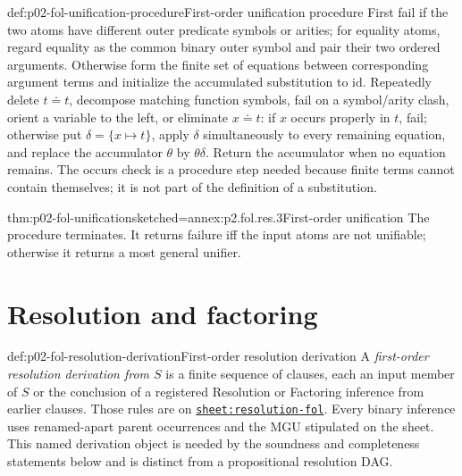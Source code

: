 \begin{hbmethod}{def:p02-fol-unification-procedure}{First-order unification procedure}
First fail if the two atoms have different outer predicate symbols or arities;
for equality atoms, regard equality as the common binary outer symbol and pair
their two ordered arguments.  Otherwise form the finite set of equations
between corresponding argument terms and initialize the accumulated
substitution to \(\mathrm{id}\).  Repeatedly delete \(t\doteq t\), decompose
matching function symbols, fail on a symbol/arity clash, orient a variable to
the left, or eliminate \(x\doteq t\): if \(x\) occurs properly in \(t\),
fail; otherwise put \(\delta=\{x\mapsto t\}\), apply \(\delta\)
simultaneously to every remaining equation, and replace the accumulator
\(\theta\) by \(\theta\delta\).  Return the accumulator when
no equation remains.  The occurs check is a procedure step needed because
finite terms cannot contain themselves; it is not part of the definition of
a substitution.
\end{hbmethod}

\begin{hbtheorem}{thm:p02-fol-unification}{sketched=annex:p2.fol.res.3}{First-order unification}
The procedure terminates.  It returns failure iff the input atoms are not
unifiable; otherwise it returns a most general unifier.
\end{hbtheorem}

\section{Resolution and factoring}
\label{sec:p02-fol-resolution-calculus}

\begin{hbdefinition}{def:p02-fol-resolution-derivation}{First-order resolution derivation}
A \emph{first-order resolution derivation from \(S\)}
 is a finite sequence
of clauses, each an input member of \(S\) or the conclusion of a registered
Resolution or Factoring inference from earlier clauses.  Those rules are on
\hyperref[sheet:resolution-fol]{\texttt{sheet:resolution-fol}}.
Every binary inference uses renamed-apart parent
occurrences and the MGU stipulated on the sheet.  This named derivation
object is needed by the soundness and completeness statements below and is
distinct from a propositional resolution DAG.
\end{hbdefinition}

